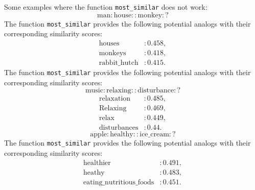 \documentclass[a4paper,10pt]{article}
\begin{document}
\begin{answerbox}
Some examples where the function \texttt{most\_similar} does not work:
\[
\text{man} : \text{house} :: \text{monkey} : ?
\]
The function \texttt{most\_similar} provides the following potential analogs with their corresponding similarity scores:
\begin{align*}
    \text{houses} & : 0.458, \\
    \text{monkeys} & : 0.418, \\
    \text{rabbit\_hutch} & : 0.415.
\end{align*}
The function \texttt{most\_similar} provides the following potential analogs with their corresponding similarity scores:
\[
\text{music} : \text{relaxing} ::\text{disturbance} : ?
\]
\begin{align*}
    \text{relaxation} & : 0.485, \\
    \text{Relaxing} & : 0.469, \\
    \text{relax} & : 0.449, \\
    \text{disturbances} & : 0.44.
\end{align*}
\[
\text{apple} : \text{healthy} :: \text{ice\_cream} : ?
\]
The function \texttt{most\_similar} provides the following potential analogs with their corresponding similarity scores:
\begin{align*}
    \text{healthier} & : 0.491, \\
    \text{heathy} & : 0.483, \\
    \text{eating\_nutritious\_foods} & : 0.451.
\end{align*}
\end{answerbox}
\vspace{5pt}
\end{document}
